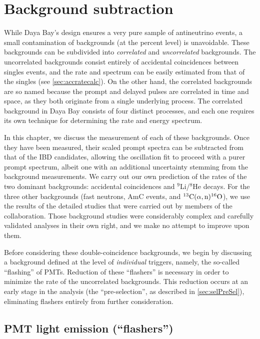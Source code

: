 \documentclass[../thesis.tex]{subfiles}
\begin{document}
\chapter{Background subtraction}
\label{chap:bkg}

While Daya Bay's design ensures a very pure sample of antineutrino events, a small contamination of backgrounds (at the percent level) is unavoidable. These backgrounds can be subdivided into \emph{correlated} and \emph{uncorrelated} backgrounds. The uncorrelated backgrounds consist entirely of accidental coincidences between singles events, and the rate and spectrum can be easily estimated from that of the singles (see \autoref{sec:accratecalc}). On the other hand, the correlated backgrounds are so named because the prompt and delayed pulses are correlated in time and space, as they both originate from a single underlying process. The correlated background in Daya Bay consists of four distinct processes, and each one requires its own technique for determining the rate and energy spectrum.

In this chapter, we discuss the measurement of each of these backgrounds. Once they have been measured, their scaled prompt spectra can be subtracted from that of the IBD candidates, allowing the oscillation fit to proceed with a purer prompt spectrum, albeit one with an additional uncertainty stemming from the background measurements. We carry out our own prediction of the rates of the two dominant backgrounds: accidental coincidences and $^9$Li/$^8$He decays. For the three other backgrounds (fast neutrons, AmC events, and $^{13}\mathrm{C}(\alpha, \mathrm{n})^{16}\mathrm{O}$), we use the results of the detailed studies that were carried out by members of the collaboration. Those background studies were considerably complex and carefully validated analyses in their own right, and we make no attempt to improve upon them.

Before considering these double-coincidence backgrounds, we begin by discussing a background defined at the level of \emph{individual} triggers, namely, the so-called ``flashing'' of PMTs. Reduction of these ``flashers'' is necessary in order to minimize the rate of the uncorrelated backgrounds. This reduction occurs at an early stage in the analysis (the ``pre-selection'', as described in \autoref{sec:selPreSel}), eliminating flashers entirely from further consideration.


\section{PMT light emission (``flashers'')}
\label{sec:bkgFlashersOverview}
\end{document}
